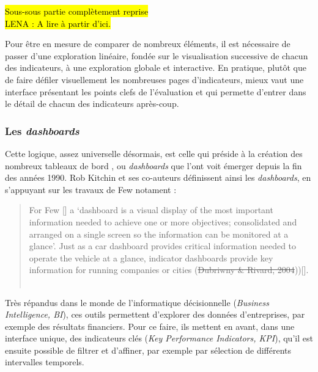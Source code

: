 	\begin{center}
		\hl{Sous-sous partie complètement reprise}\\
		\hl{LENA : A lire à partir d'ici.}
	\end{center}

	Pour être en mesure de comparer de nombreux éléments, il est nécessaire de passer d'une exploration linéaire, fondée sur le visualisation successive de chacun des indicateurs, à une exploration globale et interactive.
	En pratique, plutôt que de faire défiler visuellement les nombreuses pages d'indicateurs, mieux vaut une interface présentant les points clefs de l'évaluation et qui permette d'entrer dans le détail de chacun des indicateurs après-coup.

	\subsubsection{Les \textit{dashboards}}

	Cette logique, assez universelle désormais, est celle qui préside à la création des nombreux \og tableaux de bord \fg{}, ou \og \textit{dashboards} \fg{} que l'ont voit émerger depuis la fin des années 1990.
	Rob Kitchin et ses co-auteurs définissent ainsi les \textit{dashboards}, en s'appuyant sur les travaux de Few notament :

	\begin{quotation}
		\og For Few [\autocite[p.34]{few_information_2006}] a ‘dashboard is
		a visual display of the most important information needed to achieve one or more objectives; consolidated and arranged on a single screen so the information can be monitored at a glance’.
		Just as a car dashboard provides critical information needed to operate the vehicle at a glance, indicator dashboards provide key information for running companies or cities (\st{Dubriwny \& Rivard, 2004}))[\autocite{rivard_are_2004}].\fg{}\\
		\mbox{}~ \hfill \cite[p. 11]{kitchin_knowing_2015}
	\end{quotation}

	Très répandus dans le monde de l'informatique décisionnelle (\textit{Business Intelligence, BI}), ces outils permettent d'explorer des données d'entreprises, par exemple des résultats financiers.
	Pour ce faire, ils mettent en avant, dans une interface unique, des indicateurs clés (\textit{Key Performance Indicators, KPI}), qu'il est ensuite possible de filtrer et d'affiner, par exemple par sélection de différents intervalles temporels.

